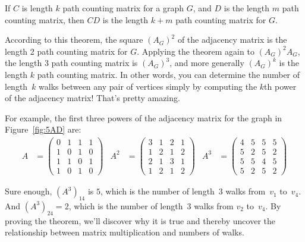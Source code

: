 \begin{theorem}\label{thm:CkDm}
 If $C$ is length $k$ path counting matrix for a graph $G$,
  and $D$ is the length $m$ path counting matrix, then $CD$ is the length
  $k+m$ path counting matrix for $G$.
\end{theorem}

According to this theorem, the square $(A_G)^2$ of the adjacency matrix is
the length 2 path counting matrix for $G$.  Applying the theorem again to
$(A_G)^2A_G$, the length 3 path counting matrix is $(A_G)^3$, and more generally
$(A_G)^k$ is the length $k$ path counting matrix.  In other
words, you can determine the number of length~$k$ walks between any pair
of vertices simply by computing the $k$th power of the adjacency matrix!
That's pretty amazing.

For example, the first three powers of the adjacency matrix for the
graph in Figure~\ref{fig:5AD} are:
\begin{align*}
    A &= \begin{pmatrix}
            0 & 1 & 1 & 1 \\
            1 & 0 & 1 & 0 \\
            1 & 1 & 0 & 1 \\
            1 & 0 & 1 & 0
         \end{pmatrix} & %
  A^2 &= \begin{pmatrix}
            3 & 1 & 2 & 1 \\
            1 & 2 & 1 & 2 \\
            2 & 1 & 3 & 1 \\
            1 & 2 & 1 & 2
         \end{pmatrix} & %
  A^3 &= \begin{pmatrix}
            4 & 5 & 5 & 5 \\
            5 & 2 & 5 & 2 \\
            5 & 5 & 4 & 5 \\
            5 & 2 & 5 & 2
         \end{pmatrix}
\end{align*}

Sure enough, $(A^3)_{14}$ is $5$, which is the number of length~3 walks
from~$v_1$ to~$v_4$.  And $(A^3)_{24} = 2$, which is the number of
length~3 walks from $v_2$ to~$v_4$.  By proving the theorem, we'll
discover why it is true and thereby uncover the relationship between
matrix multiplication and numbers of walks.

